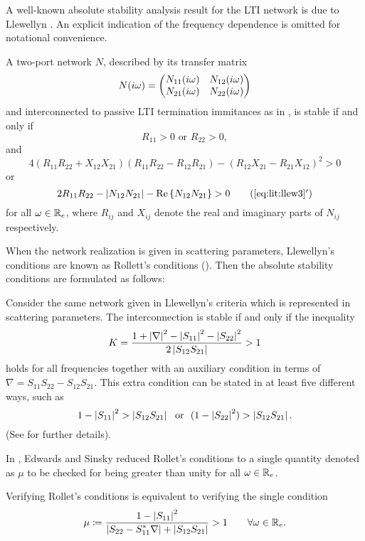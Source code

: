 A well-known absolute stability analysis result for the LTI network is due to Llewellyn \cite{llewellyn}. 
An explicit indication of the frequency dependence is omitted for notational convenience.
\begin{thm}\label{thm:apdx:llw}
A two-port network $N$,  described by its transfer matrix
\[
N(i\omega) = \begin{pmatrix}N_{11}(i\omega) &N_{12}(i\omega)\\N_{21}(i\omega) &N_{22}(i\omega)\end{pmatrix}
\]
and interconnected to passive LTI termination immitances as in , is stable if and only if
\begin{equation}R_{11} > 0\text{ or } R_{22} > 0,\label{eq:lit:llew2}\end{equation} and
\begin{equation}
4\left(R_{11}R_{22}+X_{12}X_{21}\right)\left(R_{11}R_{22}-R_{12}R_{21}\right)-\left(R_{12}X_{21}-R_{21}X_{12}\right)^2 > 0
\label{eq:lit:llew3}
\end{equation} 
or
\begin{equation*}2R_{11}R_{22}-\abs{N_{12}N_{21}}-\Re{N_{12}N_{21}} > 0\tag{\ref{eq:lit:llew3}$'$}\end{equation*}
for all $\omega\in\mathbb{R}_e$, where $R_{ij}$ and $X_{ij}$ denote the real and imaginary parts of $N_{ij}$ respectively.
\end{thm}

When the network realization is given in scattering parameters, Llewellyn's conditions are known as Rollett's 
conditions (\cite{stern,rollett,kurokawa}). Then the absolute stability conditions are formulated as follows: 

\begin{thm} Consider the same network given in Llewellyn's criteria which is represented in scattering parameters.
The interconnection is stable if and only if the inequality 
\begin{equation}
K = \frac{1+\displaystyle \left|\nabla\right|^2-\displaystyle \left|S_{11}\right|^2-\displaystyle \left|S_{22}\right|^2}{2\displaystyle \left|S_{12}S_{21}\right|} > 1
\end{equation}
holds for all frequencies together with an auxiliary condition in terms of $\nabla = S_{11}S_{22}-
S_{12}S_{21}$. This extra condition can be stated in at least five different ways, such as 
\[ 
1-\displaystyle \left|S_{11}\right|^2 > \displaystyle \left|S_{12}S_{21}\right|\ \text{ or } \ (1-\displaystyle \left|S_{22}\right|^2)> \displaystyle \left|S_{12}S_{21}\right|. 
\] 
(See \cite{edsin} for further details). 
\end{thm}

In \cite{edsin}, Edwards and Sinsky reduced Rollet's conditions to a single quantity denoted as $\mu$ to be checked 
for being greater than unity for all $\omega\in\mathbb{R}_e$. 
 \begin{thm} Verifying Rollet's conditions is equivalent to verifying the single condition
\[
\mu\coloneqq \frac{1-\displaystyle \left|S_{11}\right|^2}{\displaystyle \left|S_{22}-S_{11}^*\nabla\right|+\displaystyle \left|S_{12}S_{21}\right|} > 1\qquad \forall \omega\in\mathbb{R}_e.
\]
\end{thm}

